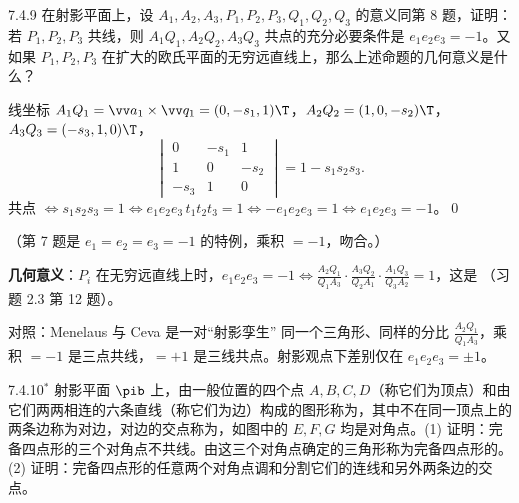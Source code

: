 \begin{ex}{7.4.9}
在射影平面上，设 $A_1,A_2,A_3,P_1,P_2,P_3,Q_1,Q_2,Q_3$ 的意义同第 8 题，证明：若 $P_1,P_2,P_3$ 共线，则 $A_1Q_1,A_2Q_2,A_3Q_3$ 共点的充分必要条件是 $e_1e_2e_3=-1$。又如果 $P_1,P_2,P_3$ 在扩大的欧氏平面的无穷远直线上，那么上述命题的几何意义是什么？
\end{ex}
\zheng 线坐标 $A_1Q_1=\vv a_1\times\vv q_1=(0,-s_1,1)\T$，$A_2Q_2=(1,0,-s_2)\T$，$A_3Q_3=(-s_3,1,0)\T$，
\[
\begin{vmatrix}0&-s_1&1\\1&0&-s_2\\-s_3&1&0\end{vmatrix}=1-s_1s_2s_3 .
\]
共点 $\iff s_1s_2s_3=1\iff e_1e_2e_3\,t_1t_2t_3=1\iff -e_1e_2e_3=1\iff e_1e_2e_3=-1$。\qed

（第 7 题是 $e_1=e_2=e_3=-1$ 的特例，乘积 $=-1$，吻合。）

\textbf{几何意义}：$P_i$ 在无穷远直线上时，$e_1e_2e_3=-1\iff\frac{A_2Q_1}{Q_1A_3}\cdot\frac{A_3Q_2}{Q_2A_1}\cdot\frac{A_1Q_3}{Q_3A_2}=1$，这是 （习题 2.3 第 12 题）。

\begin{ckbox}{对照：Menelaus 与 Ceva 是一对“射影孪生”}
同一个三角形、同样的分比 $\frac{A_2Q_1}{Q_1A_3}$，乘积 $=-1$ 是三点共线，$=+1$ 是三线共点。射影观点下差别仅在 $e_1e_2e_3=\pm1$。
\end{ckbox}

\begin{ex}{7.4.10$^*$}
射影平面 $\pib$ 上，由一般位置的四个点 $A,B,C,D$（称它们为顶点）和由它们两两相连的六条直线（称它们为边）构成的图形称为，其中不在同一顶点上的两条边称为对边，对边的交点称为，如图中的 $E,F,G$ 均是对角点。(1) 证明：完备四点形的三个对角点不共线。由这三个对角点确定的三角形称为完备四点形的。(2) 证明：完备四点形的任意两个对角点调和分割它们的连线和另外两条边的交点。
\end{ex}

